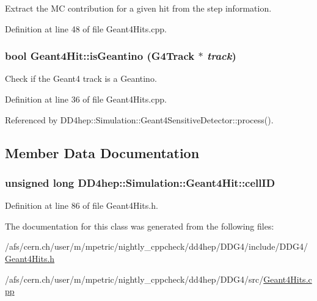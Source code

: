 Extract the MC contribution for a given hit from the step information. 

Definition at line 48 of file Geant4Hits.cpp.\hypertarget{class_d_d4hep_1_1_simulation_1_1_geant4_hit_a4849a8685e28342d97aff6166a2f348d}{
\subsubsection[{isGeantino}]{\setlength{\rightskip}{0pt plus 5cm}bool Geant4Hit::isGeantino (G4Track $\ast$ {\em track})}}
\label{class_d_d4hep_1_1_simulation_1_1_geant4_hit_a4849a8685e28342d97aff6166a2f348d}


Check if the Geant4 track is a Geantino. 

Definition at line 36 of file Geant4Hits.cpp.

Referenced by DD4hep::Simulation::Geant4SensitiveDetector::process().

\subsection{Member Data Documentation}
\hypertarget{class_d_d4hep_1_1_simulation_1_1_geant4_hit_a4ad2477cc6b2280300970d709190174d}{
\subsubsection[{cellID}]{\setlength{\rightskip}{0pt plus 5cm}unsigned long {\bf DD4hep::Simulation::Geant4Hit::cellID}}}
\label{class_d_d4hep_1_1_simulation_1_1_geant4_hit_a4ad2477cc6b2280300970d709190174d}


Definition at line 86 of file Geant4Hits.h.

The documentation for this class was generated from the following files:\begin{DoxyCompactItemize}
\item 
/afs/cern.ch/user/m/mpetric/nightly\_\-cppcheck/dd4hep/DDG4/include/DDG4/\hyperlink{_geant4_hits_8h}{Geant4Hits.h}\item 
/afs/cern.ch/user/m/mpetric/nightly\_\-cppcheck/dd4hep/DDG4/src/\hyperlink{_geant4_hits_8cpp}{Geant4Hits.cpp}\end{DoxyCompactItemize}
